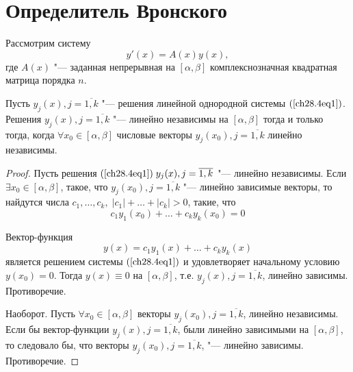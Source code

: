 \section{Определитель Вронского}

Рассмотрим систему 
\begin{equation} \label{ch28.4eq1}
y'(x) = A(x)y(x),
\end{equation}
где $A(x)$ "--- заданная непрерывная на $[\alpha, \beta]$ комплекснозначная квадратная матрица порядка $n$.

\begin{thm} \label{ch28.3thm1}
Пусть $y_j(x), j = \overline{1,k}$ "--- решения линейной однородной системы $(\ref{ch28.4eq1})$. Решения $y_j(x), j = \overline{1,k}$ "--- линейно независимы на $[\alpha, \beta]$ тогда и только тогда, когда $\forall x_0 \in [\alpha, \beta]$ числовые векторы $y_j(x_0), j = \overline{1,k}$ линейно независимы.
\end{thm}

\begin{proof}
Пусть решения $(\ref{ch28.4eq1}) \; y_j(x), j = \overline{1,k}$ "--- линейно независимы. Если $\exists x_0 \in [\alpha, \beta]$, такое, что $y_j(x_0), j = \overline{1,k}$ "--- линейно зависимые векторы, то найдутся числа $c_1, \ldots, c_k, \; |c_1| + \ldots + |c_k| > 0$, такие, что
$$
c_1y_1(x_0) + \ldots + c_k y_k(x_0) = 0
$$

Вектор-функция
$$
y(x) = c_1y_1(x) + \ldots + c_k y_k(x)
$$
является решением системы $(\ref{ch28.4eq1})$ и удовлетворяет начальному условию $y(x_0) = 0$. Тогда $y(x) \equiv 0$ на $[\alpha, \beta]$, т.е. $y_j(x), j = \overline{1,k}$, линейно зависимы. Противоречие.

Наоборот. Пусть $\forall x_0 \in [\alpha, \beta]$ векторы $y_j(x_0), j = \overline{1,k}$, линейно независимы. Если бы вектор-функции $y_j(x), j = \overline{1,k}$, были линейно зависимыми на $[\alpha,\beta]$, то следовало бы, что векторы $y_j(x_0), j = \overline{1,k}$, "--- линейно зависимы. Противоречие.
\end{proof}

